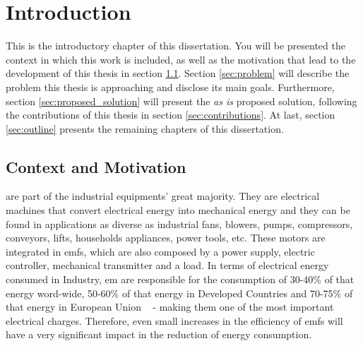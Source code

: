 \newcommand{\unlthesis}{\emph{unlthesis}}
\newcommand{\unlthesisclass}{\texttt{unlthesis.cls}}

\chapter{Introduction}  
\label{cha:introduction} 

This is the introductory chapter of this dissertation. You will be presented the context in which this work is included, as well as the motivation that lead to the development of this thesis in section \ref{sec:motivation}. Section \ref{sec:problem} will describe the problem this thesis is approaching and disclose its main goals. Furthermore, section \ref{sec:proposed_solution} will present the \emph{as is} proposed solution, following the contributions of this thesis in section \ref{sec:contributions}. At last, section \ref{sec:outline} presents the remaining chapters of this dissertation.

\section{Context and Motivation} %
\label{sec:motivation}

 are part of the industrial equipments' great majority. They are electrical machines that convert electrical energy into mechanical energy and they can be found in applications as diverse as industrial fans, blowers, pumps, compressors, conveyors, lifts, households appliances, power tools, etc. 
These motors are integrated in \acrfull{emfs}, which are also composed by a power supply, electric controller, mechanical transmitter and a load. 
In terms of electrical energy consumed in Industry, \acrshort{em} are responsible for the consumption of 30-40\% of that energy word-wide, 50-60\% of that energy in Developed Countries and 70-75\% of that energy in European Union ~\cite{Ferreira1} - making them one of the most important electrical charges. 
Therefore, even small increases in the efficiency of \acrshort{emfs} will have a very significant impact in the reduction of energy consumption.


